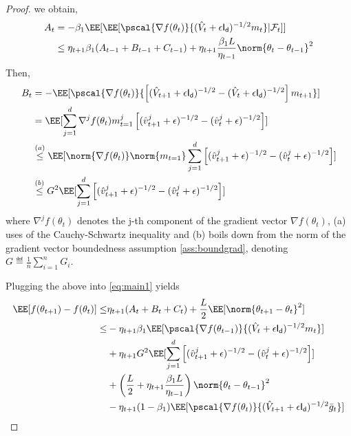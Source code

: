 \documentclass[11pt]{article}
\begin{document}
\begin{proof}
we obtain,
\begin{equation}\label{eq:termA}
\begin{split}
A_t & = - \beta_1\EE[\EE[\pscal{\nabla f(\theta_t)}{(\hat{V}_{t} + \epsilon \mathsf{I_d})^{-1/2} m_{t}}| \mathcal{F}_t]]\\
&  \leq \eta_{t+1} \beta_1(A_{t-1} + B_{t-1} + C_{t-1})  + \eta_{t+1}\frac{\beta_1 L}{\eta_{t-1}} \norm{\theta_t - \theta_{t-1}}^2
\end{split}
\end{equation}
Then,
\begin{equation}\label{eq:termB}
\begin{split}
B_t & =-  \EE[\pscal{\nabla f(\theta_t)}{\left[(\hat{V}_{t+1} + \epsilon \mathsf{I_d})^{-1/2} - (\hat{V}_{t} + \epsilon \mathsf{I_d})^{-1/2}  \right]m_{t+1}}]\\
& =  \EE[\sum_{j=1}^d  \nabla^j f(\theta_t)m_{t=1}^j \left[(\hat{v}^j_{t+1} + \epsilon )^{-1/2} - (\hat{v}^j_{t} + \epsilon )^{-1/2}  \right] ]\\
& \overset{(a)}{\leq}  \EE[\norm{\nabla f(\theta_t)} \norm{m_{t=1}}\sum_{j=1}^d\left[(\hat{v}^j_{t+1} + \epsilon )^{-1/2} - (\hat{v}^j_{t} + \epsilon )^{-1/2}  \right] ]\\
& \overset{(b)}{\leq}  G^2 \EE[\sum_{j=1}^d \left[(\hat{v}^j_{t+1} + \epsilon )^{-1/2} - (\hat{v}^j_{t} + \epsilon )^{-1/2}  \right] ]
\end{split}
\end{equation}
where $\nabla^j f(\theta_t)$ denotes the j-th component of the gradient vector $\nabla f(\theta_t)$, (a) uses of the Cauchy-Schwartz inequality and (b) boils down from the norm of the gradient vector boundedness assumption \ref{ass:boundgrad}, denoting $G \eqdef \frac{1}{n}\sum_{i=1}^n G_i$.


Plugging the above into \eqref{eq:main1} yields
\begin{equation}
\begin{split}
\EE[f(\theta_{t+1}) - f(\theta_{t}) ] \leq & \eta_{t+1}(A_t + B_t + C_t) + \frac{L}{2} \EE[\norm{\theta_{t+1} - \theta_{t}}^2]\\
 \leq &- \eta_{t+1} \beta_1\EE[\pscal{\nabla f(\theta_{t-1})}{(\hat{V}_{t} + \epsilon \mathsf{I_d})^{-1/2} m_{t}}]\\
&+   \eta_{t+1} G^2 \EE[\sum_{j=1}^d \left[(\hat{v}^j_{t+1} + \epsilon )^{-1/2} - (\hat{v}^j_{t} + \epsilon )^{-1/2}  \right] ]\\
&+  \left(\frac{L}{2} + \eta_{t+1}\frac{\beta_1 L}{\eta_{t-1}} \right) \norm{\theta_t - \theta_{t-1}}^2\\
&-   \eta_{t+1}(1-\beta_1) \EE[\pscal{\nabla f(\theta_t)}{(\hat{V}_{t+1} + \epsilon \mathsf{I_d})^{-1/2} \bar{g}_t}]
\end{split}
\end{equation}


\end{proof}
\end{document}
